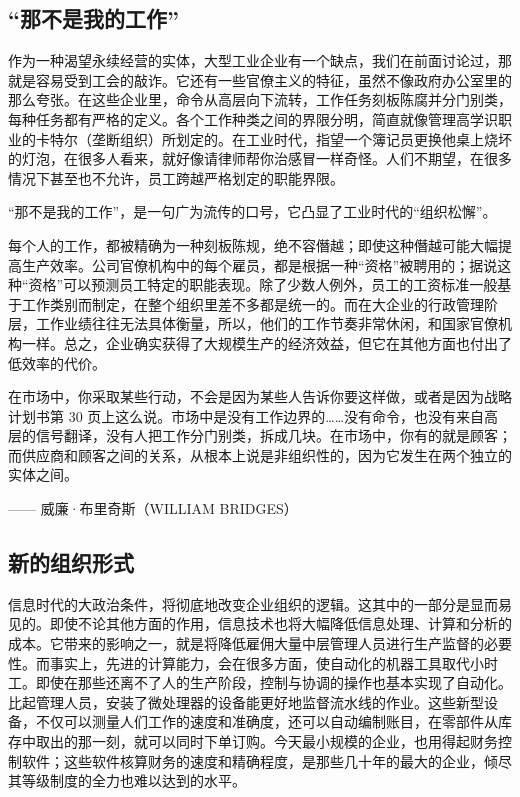 \subsection{“那不是我的工作”}
作为一种渴望永续经营的实体，大型工业企业有一个缺点，我们在前面讨论过，那就是容易受到工会的敲诈。它还有一些官僚主义的特征，虽然不像政府办公室里的那么夸张。在这些企业里，命令从高层向下流转，工作任务刻板陈腐并分门别类，每种任务都有严格的定义。各个工作种类之间的界限分明，简直就像管理高学识职业的卡特尔（垄断组织）所划定的。在工业时代，指望一个簿记员更换他桌上烧坏的灯泡，在很多人看来，就好像请律师帮你治感冒一样奇怪。人们不期望，在很多情况下甚至也不允许，员工跨越严格划定的职能界限。

“那不是我的工作”，是一句广为流传的口号，它凸显了工业时代的“组织松懈”。

每个人的工作，都被精确为一种刻板陈规，绝不容僭越；即使这种僭越可能大幅提高生产效率。公司官僚机构中的每个雇员，都是根据一种“资格”被聘用的；据说这种“资格”可以预测员工特定的职能表现。除了少数人例外，员工的工资标准一般基于工作类别而制定，在整个组织里差不多都是统一的。而在大企业的行政管理阶层，工作业绩往往无法具体衡量，所以，他们的工作节奏非常休闲，和国家官僚机构一样。总之，企业确实获得了大规模生产的经济效益，但它在其他方面也付出了低效率的代价。

\begin{tcolorbox}
在市场中，你采取某些行动，不会是因为某些人告诉你要这样做，或者是因为战略计划书第 30 页上这么说。市场中是没有工作边界的……没有命令，也没有来自高层的信号翻译，没有人把工作分门别类，拆成几块。在市场中，你有的就是顾客；而供应商和顾客之间的关系，从根本上说是非组织性的，因为它发生在两个独立的实体之间。
\begin{flushright}
—— 威廉·布里奇斯（WILLIAM BRIDGES） 
\end{flushright}
\end{tcolorbox}

\subsection{新的组织形式}
信息时代的大政治条件，将彻底地改变企业组织的逻辑。这其中的一部分是显而易见的。即使不论其他方面的作用，信息技术也将大幅降低信息处理、计算和分析的成本。它带来的影响之一，就是将降低雇佣大量中层管理人员进行生产监督的必要性。而事实上，先进的计算能力，会在很多方面，使自动化的机器工具取代小时工。即使在那些还离不了人的生产阶段，控制与协调的操作也基本实现了自动化。比起管理人员，安装了微处理器的设备能更好地监督流水线的作业。这些新型设备，不仅可以测量人们工作的速度和准确度，还可以自动编制账目，在零部件从库存中取出的那一刻，就可以同时下单订购。今天最小规模的企业，也用得起财务控制软件；这些软件核算财务的速度和精确程度，是那些几十年的最大的企业，倾尽其等级制度的全力也难以达到的水平。

